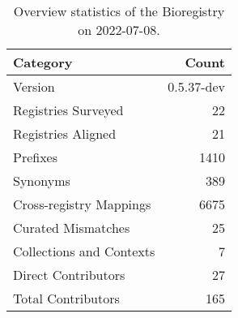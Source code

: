 \begin{table}
\centering
\caption{Overview statistics of the Bioregistry on 2022-07-08.}
\label{tab:bioregistry-summary}
\begin{tabular}{lr}
\toprule
                Category &      Count \\
\midrule
                 Version & 0.5.37-dev \\
     Registries Surveyed &         22 \\
      Registries Aligned &         21 \\
                Prefixes &       1410 \\
                Synonyms &        389 \\
 Cross-registry Mappings &       6675 \\
      Curated Mismatches &         25 \\
Collections and Contexts &          7 \\
     Direct Contributors &         27 \\
      Total Contributors &        165 \\
\bottomrule
\end{tabular}
\end{table}
